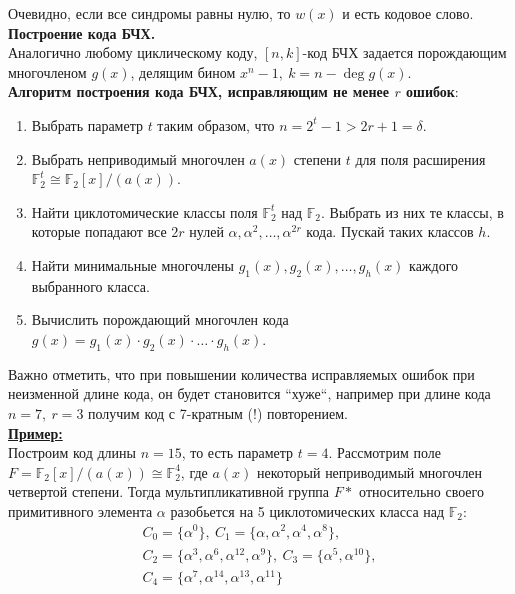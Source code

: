 Очевидно, если все синдромы равны нулю, то $w(x)$ и есть кодовое слово.\\

\textbf{Построение кода БЧХ.}\\
Аналогично любому циклическому коду, $[n,k]$-код БЧХ задается порождающим
многочленом $g(x)$, делящим бином $x^n - 1,~k = n - \deg g(x)$.\\

\textbf{Алгоритм построения кода БЧХ, исправляющим не менее $r$ ошибок}:
\begin{enumerate}
  \item Выбрать параметр $t$ таким образом, что $n = 2^t - 1 > 2r + 1 = \delta$.
  \item Выбрать неприводимый многочлен $a(x)$ степени $t$ для поля расширения
    $\mathbb{F}_2^t \cong \mathbb{F}_2[x]/(a(x))$.
  \item Найти циклотомические классы поля $\mathbb{F}_2^t$ над $\mathbb{F}_2$. Выбрать из них те
    классы, в которые попадают все $2r$ нулей
    $\alpha, \alpha^2, \ldots, \alpha^{2r}$ кода. Пускай таких классов $h$.

  \item Найти минимальные многочлены $g_1(x), g_2(x), \ldots, g_h(x)$ каждого
    выбранного класса.
  \item  Вычислить порождающий многочлен кода
    $g(x) = g_1(x)\cdot g_2(x)\cdot\ldots\cdot g_h(x)$.
\end{enumerate}

Важно отметить, что при повышении количества исправляемых ошибок при неизменной
длине кода, он будет становится ``хуже``, например при длине кода $n = 7,~r = 3$
получим код с 7-кратным (!) повторением.\\

\textbf{\underline{Пример:}}\\
Построим код длины $n = 15$, то есть параметр $t = 4$.
Рассмотрим поле $F = \mathbb{F}_2[x]/(a(x)) \cong \mathbb{F}_2^4$, где $a(x)$ некоторый
неприводимый многочлен четвертой степени. Тогда мультипликативной группа $F*$
относительно своего примитивного элемента $\alpha$ разобьется на 5
циклотомических класса над $\mathbb{F}_2$:
\begin{gather*}
  C_0 = \{\alpha^0\},~C_1 = \{\alpha, \alpha^2, \alpha^4, \alpha^8 \},\\
  C_2 = \{\alpha^3, \alpha^6, \alpha^{12}, \alpha^9\},~
  C_3 = \{\alpha^5, \alpha^{10}\},\\
  C_4 = \{\alpha^7, \alpha^{14}, \alpha^{13}, \alpha^{11}\}
\end{gather*}

